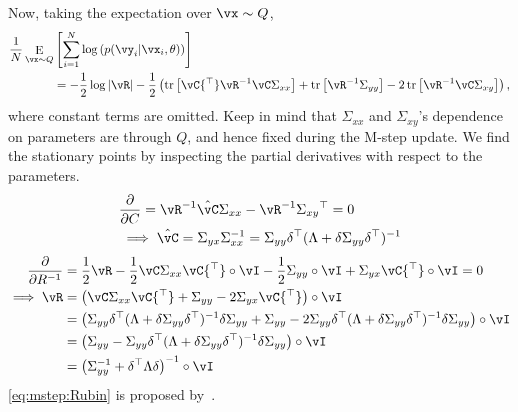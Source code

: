 \documentclass{article}
\DeclareMathOperator*{\E}{\rm E}
\DeclareMathOperator{\tr}{tr}
\newcommand{\trp}{{^\top}} %
\newcommand{\inv}{^{-1}}
\newcommand{\oneHalf}{\frac{1}{2}}
\newcommand{\hadamard}{\circ}
\newcounter{ct}
\begin{document}
Now, taking the expectation over $\vx \sim Q$,
\begin{align}
\frac{1}{N}
    \E_{\vx\sim Q}&\left[
\sum_{i=1}^N \log\left(
	p(\vy_i| \vx_i, \theta)
    \right)
\right]
    \nonumber\\
    &=
    -\oneHalf \log |\vR|
    -\oneHalf 
	\left(
	    \tr\left[
		\vC\trp \vR\inv \vC 
		\Sigma_{xx}
	    \right]
	    +
	    \tr\left[
		\vR\inv 
		\Sigma_{yy}
	    \right]
	    -
	    2\tr\left[
		\vR\inv \vC 
		\Sigma_{xy}
	    \right]
	\right),
\end{align}
where constant terms are omitted.
Keep in mind that $\Sigma_{xx}$ and $\Sigma_{xy}$'s dependence on parameters
are through $Q$, and hence fixed during the M-step update.
We find the stationary points by inspecting the partial derivatives with
respect to the parameters.
\begin{align}\label{eq:mstep:C}
&\frac{\partial}{\partial C}
= \vR\inv \hat{\vC} \Sigma_{xx} - \vR\inv \Sigma_{xy}\trp = 0
\\
& \implies \hat{\vC} = \Sigma_{yx}\Sigma_{xx}\inv
= \Sigma_{yy} \delta\trp (\Lambda + \delta\Sigma_{yy}\delta\trp)\inv
\end{align}
%
\begin{align}\label{eq:mstep:R}
\frac{\partial}{\partial R\inv}
&= \oneHalf \vR -\oneHalf \vC\Sigma_{xx}\vC\trp \hadamard \vI 
- \oneHalf\Sigma_{yy} \hadamard \vI + \Sigma_{yx}\vC\trp \hadamard \vI  = 0
\\
\implies \vR &= 
\left(
    \vC\Sigma_{xx}\vC\trp + \Sigma_{yy} - 2\Sigma_{yx}\vC\trp
\right) \hadamard \vI
\\
&=
\left(
    \Sigma_{yy} \delta\trp (\Lambda + \delta\Sigma_{yy}\delta\trp)\inv
    \delta
    \Sigma_{yy} 
    + \Sigma_{yy} 
    - 2\Sigma_{yy} \delta\trp
    (\Lambda + \delta\Sigma_{yy}\delta\trp)\inv
    \delta
    \Sigma_{yy} 
\right) \hadamard \vI
\\
&=
\left(
    \Sigma_{yy} 
    -
    \Sigma_{yy} \delta\trp (\Lambda + \delta\Sigma_{yy}\delta\trp)\inv
    \delta
    \Sigma_{yy} 
\right) 
\hadamard \vI
\label{eq:mstep:Rubin}
\\
&=
\left(
    \Sigma_{yy}\inv + \delta\trp\Lambda\delta
\right)\inv
\hadamard \vI
\end{align}
\eqref{eq:mstep:Rubin} is proposed by~\cite{Rubin1982}.



\end{document}
